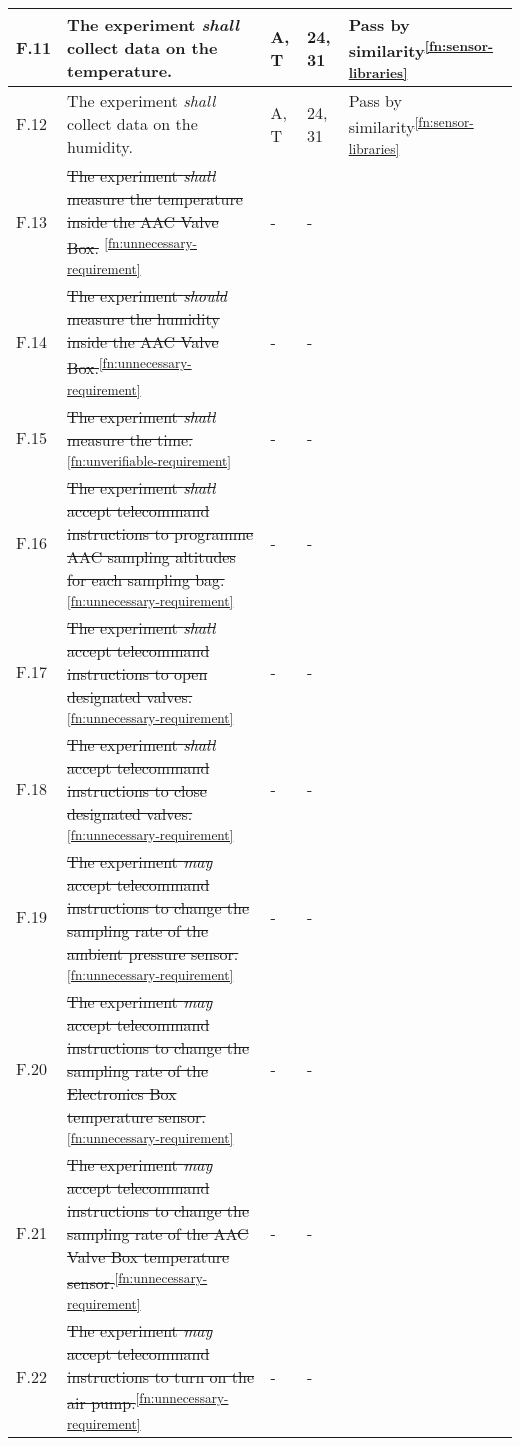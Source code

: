 \begin{longtable}[]{|m{}| m{} |m{} |m{}|m{}|}
F.11 & The experiment \textit{shall} collect data on the temperature. &  A, T& 24, 31 & Pass by similarity\textsuperscript{\ref{fn:sensor-libraries}}\\ \hline
F.12 & The experiment \textit{shall} collect data on the humidity. & A, T & 24, 31  & Pass by similarity\textsuperscript{\ref{fn:sensor-libraries}}\\ \hline
F.13 & \st{The experiment \textit{shall} measure the temperature inside the AAC Valve Box.} \textsuperscript{\ref{fn:unnecessary-requirement}}&- & -& \\ \hline
F.14 & \st{The experiment \textit{should} measure the humidity inside the AAC Valve Box.}\textsuperscript{\ref{fn:unnecessary-requirement}} & -&- & \\ \hline
F.15 & \st{The experiment \textit{shall} measure the time.} \textsuperscript{\ref{fn:unverifiable-requirement}}&- &-&\\ \hline
F.16 & \st{The experiment \textit{shall} accept telecommand instructions to programme AAC sampling altitudes for each sampling bag.}\textsuperscript{\ref{fn:unnecessary-requirement}} &- &- &\\ \hline
F.17 & \st{The experiment \textit{shall} accept telecommand instructions to open designated valves.}\textsuperscript{\ref{fn:unnecessary-requirement}} &- &- & \\ \hline
F.18 & \st{The experiment \textit{shall} accept telecommand instructions to close designated valves.}\textsuperscript{\ref{fn:unnecessary-requirement}} &- &- & \\ \hline
F.19 & \st{The experiment \textit{may} accept telecommand instructions to change the sampling rate of the ambient pressure sensor.}\textsuperscript{\ref{fn:unnecessary-requirement}} &- &- & \\ \hline
F.20 & \st{The experiment \textit{may} accept telecommand instructions to change the sampling rate of the Electronics Box temperature sensor.}\textsuperscript{\ref{fn:unnecessary-requirement}} &- &- & \\ \hline
F.21 & \st{The experiment \textit{may} accept telecommand instructions to change the sampling rate of the AAC Valve Box temperature sensor.}\textsuperscript{\ref{fn:unnecessary-requirement}}& -&-&\\ \hline
F.22 & \st{The experiment \textit{may} accept telecommand instructions to turn on the air pump.}\textsuperscript{\ref{fn:unnecessary-requirement}}                                                                                              &      -        & -            &        \\ \hline

\end{longtable}
